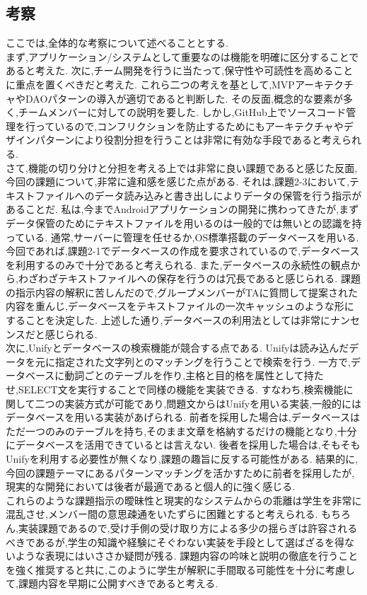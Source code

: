 \documentclass[12pt]{jarticle}
\begin{document}
\subsection{考察}
ここでは,全体的な考察について述べることとする. \\
まず,アプリケーション/システムとして重要なのは機能を明確に区分することであると考えた.
次に,チーム開発を行うに当たって,保守性や可読性を高めることに重点を置くべきだと考えた.
これら二つの考えを基として,MVPアーキテクチャやDAOパターンの導入が適切であると判断した.
その反面,概念的な要素が多く,チームメンバーに対しての説明を要した.
しかし,GitHub上でソースコード管理を行っているので,コンフリクションを防止するためにもアーキテクチャやデザインパターンにより役割分担を行うことは非常に有効な手段であると考えられる. \\

さて,機能の切り分けと分担を考える上では非常に良い課題であると感じた反面,今回の課題について,非常に違和感を感じた点がある.
それは,課題2-3において,テキストファイルへのデータ読み込みと書き出しによりデータの保管を行う指示があることだ.
私は,今までAndroidアプリケーションの開発に携わってきたが,まずデータ保管のためにテキストファイルを用いるのは一般的では無いとの認識を持っている.
通常,サーバーに管理を任せるか,OS標準搭載のデータベースを用いる.
今回であれば,課題2-1でデータベースの作成を要求されているので,データベースを利用するのみで十分であると考えられる.
また,データベースの永続性の観点から,わざわざテキストファイルへの保存を行うのは冗長であると感じられる.
課題の指示内容の解釈に苦しんだので,グループメンバーがTAに質問して提案された内容を重んじ,データベースをテキストファイルの一次キャッシュのような形にすることを決定した.
上述した通り,データベースの利用法としては非常にナンセンスだと感じられる. \\
次に,Unifyとデータベースの検索機能が競合する点である.
Unifyは読み込んだデータを元に指定された文字列とのマッチングを行うことで検索を行う.
一方で,データベースに動詞ごとのテーブルを作り,主格と目的格を属性として持たせ,SELECT文を実行することで同様の機能を実装できる.
すなわち,検索機能に関して二つの実装方式が可能であり,問題文からはUnifyを用いる実装,一般的にはデータベースを用いる実装があげられる.
前者を採用した場合は,データベースはただ一つのみのテーブルを持ち,そのまま文章を格納するだけの機能となり,十分にデータベースを活用できているとは言えない.
後者を採用した場合は,そもそもUnifyを利用する必要性が無くなり,課題の趣旨に反する可能性がある.
結果的に,今回の課題テーマにあるパターンマッチングを活かすために前者を採用したが,現実的な開発においては後者が最適であると個人的に強く感じる. \\
これらのような課題指示の曖昧性と現実的なシステムからの乖離は学生を非常に混乱させ,メンバー間の意思疎通をいたずらに困難とすると考えられる.
もちろん,実装課題であるので,受け手側の受け取り方による多少の揺らぎは許容されるべきであるが,学生の知識や経験にそぐわない実装を手段として選ばざるを得ないような表現にはいささか疑問が残る.
課題内容の吟味と説明の徹底を行うことを強く推奨すると共に,このように学生が解釈に手間取る可能性を十分に考慮して,課題内容を早期に公開すべきであると考える.
\end{document}
